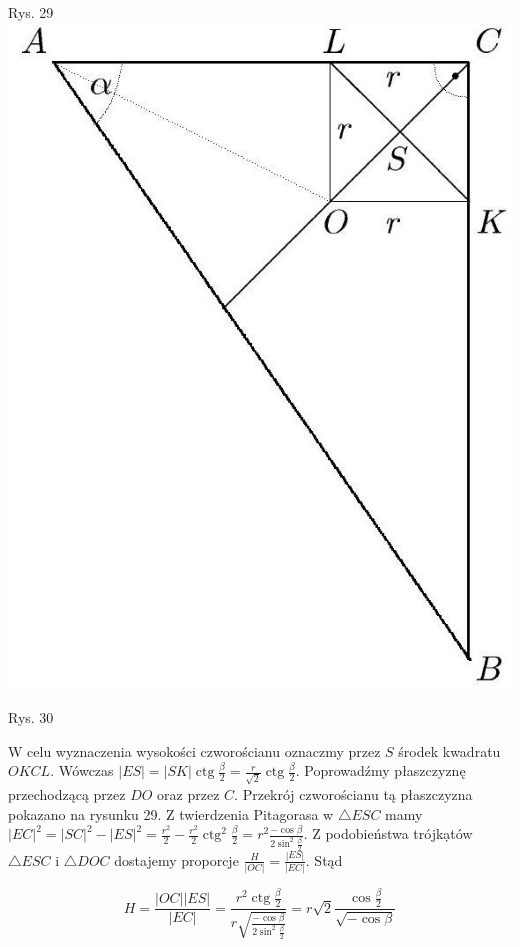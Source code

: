 \documentclass[10pt]{article}
\begin{document}
Rys. 29\\
\includegraphics[max width=\textwidth, center]{2024_11_16_fe5b564401bf7db98894g-124(1)}

Rys. 30

W celu wyznaczenia wysokości czworościanu oznaczmy przez $S$ środek kwadratu $O K C L$. Wówczas $|E S|=|S K| \operatorname{ctg} \frac{\beta}{2}=\frac{r}{\sqrt{2}} \operatorname{ctg} \frac{\beta}{2}$. Poprowadźmy płaszczyznę przechodzącą przez $D O$ oraz przez $C$. Przekrój czworościanu tą płaszczyzna pokazano na rysunku 29. Z twierdzenia Pitagorasa w $\triangle E S C$ mamy $|E C|^{2}=|S C|^{2}-|E S|^{2}=\frac{r^{2}}{2}-\frac{r^{2}}{2} \operatorname{ctg}^{2} \frac{\beta}{2}=r^{2} \frac{-\cos \beta}{2 \sin ^{2} \frac{\beta}{2}}$. Z podobieństwa trójkạtów $\triangle E S C$ i $\triangle D O C$ dostajemy proporcje $\frac{H}{|O C|}=\frac{|E S|}{|E C|}$. Stąd

$$
H=\frac{|O C||E S|}{|E C|}=\frac{r^{2} \operatorname{ctg} \frac{\beta}{2}}{r \sqrt{\frac{-\cos \beta}{2 \sin ^{2} \frac{\beta}{2}}}}=r \sqrt{2} \frac{\cos \frac{\beta}{2}}{\sqrt{-\cos \beta}}
$$
\end{document}
